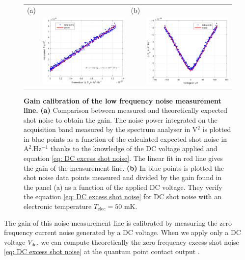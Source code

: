 \begin{figure}[hptb]
	\begin{center}
		\begin{tabular}{c c c c}
			(a) & & (b) &  \\ 
			
			& \includegraphics[width = 6cm]{./chap1/gain_noise_measurement} &
			& \includegraphics[width = 6cm]{./chap1/DC_shoit_noise_renormalized}
		\end{tabular} 
	\end{center}
	\caption{\textbf{Gain calibration of the low frequency noise measurement line.} \textbf{(a)} Comparison between measured and theoretically expected shot noise to obtain the gain. The noise power integrated on the acquisition band measured by the spectrum analyser in V$^{2}$ is plotted in blue points as a function of the calculated expected shot noise in A$^{2}$.Hz$^{-1}$ thanks to the knowledge of the DC voltage applied and equation \eqref{eq: DC excess shot noise}. The linear fit in red line gives the gain of the measurement line. \textbf{(b)} In blue points is plotted the shot noise data points measured and divided by the gain found in the panel (a) as a function of the applied DC voltage. They verify the equation \eqref{eq: DC excess shot noise} for DC shot noise with an electronic temperature $T_{\mathrm{elec}} = 50$ mK.}
	\label{fig: DC shot noise}
\end{figure}

The gain of this noise measurement line is calibrated by measuring the zero frequency current noise generated by a DC voltage.
When we apply only a DC voltage $V_{\mathrm{dc}}$, we can compute theoretically the zero frequency excess shot noise \eqref{eq: DC excess shot noise} at the quantum point contact output \cite{blanter2000shot}.

